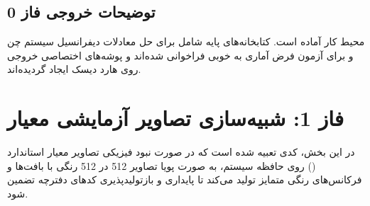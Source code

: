 \subsection*{توضیحات خروجی فاز 0}
محیط کار آماده است. کتابخانه‌های پایه شامل  برای حل معادلات دیفرانسیل سیستم چن و  برای آزمون فرض آماری به خوبی فراخوانی شده‌اند و پوشه‌های اختصاصی خروجی روی هارد دیسک ایجاد گردیده‌اند.

\section{فاز 1: شبیه‌سازی تصاویر آزمایشی معیار}
در این بخش، کدی تعبیه شده است که در صورت نبود فیزیکی تصاویر معیار استاندارد () روی حافظه سیستم، به صورت پویا تصاویر 512 در 512 رنگی با بافت‌ها و فرکانس‌های رنگی متمایز تولید می‌کند تا پایداری و بازتولیدپذیری کدهای دفترچه تضمین شود.

